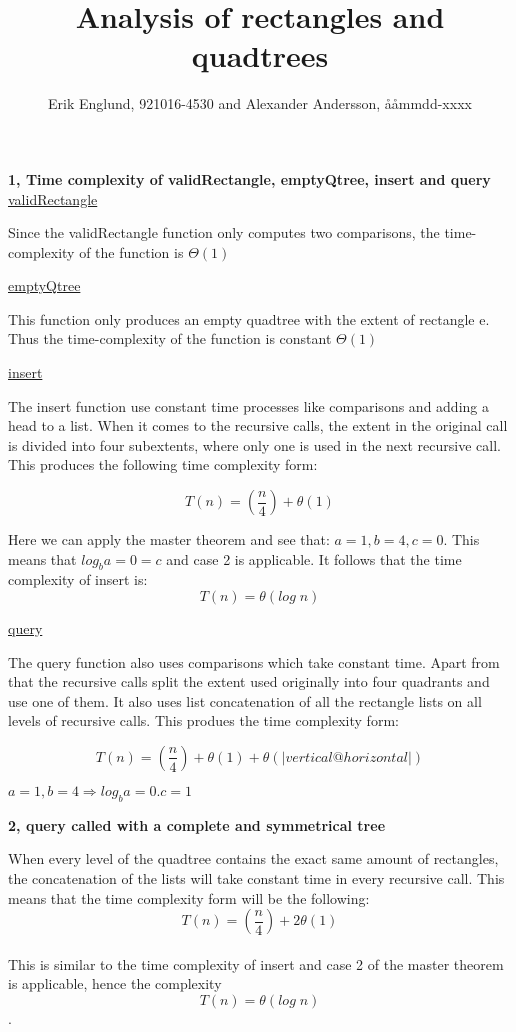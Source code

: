 \documentclass[12pt, a4paper]{article}
\title{Analysis of rectangles and quadtrees}
\author{Erik Englund, 921016-4530 and Alexander Andersson, ååmmdd-xxxx}
\begin{document}
\maketitle

\textbf{1, Time complexity of validRectangle, emptyQtree, insert and query}\\

\underline{validRectangle}

Since the validRectangle function only computes two comparisons, the time-complexity of the function is 
$\Theta(1)$




\underline{emptyQtree}

This function only produces an empty quadtree with the extent of rectangle e. Thus the time-complexity of the function is constant $\Theta(1)$



\underline{insert}

The insert function use constant time processes like comparisons and adding a head to a list. When it comes to the recursive calls, the extent in the original call is divided into four subextents, where only one is used in the next recursive call. This produces the following time complexity form:

$$T(n)=\left(\frac{n}{4}\right)+\theta(1)$$

Here we can apply the master theorem and see that: $a=1, b=4, c=0$. This means that $log_ba=0 = c$ and case 2 is applicable. It follows that the time complexity of insert is: $$T(n)=\theta(log\;n)$$





\underline{query}

The query function also uses comparisons which take constant time. Apart from that the recursive calls split the extent used originally into four quadrants and use one of them. It also uses list concatenation of all the rectangle lists on all levels of recursive calls. This produes the time complexity form:

$$T(n)=\left(\frac{n}{4}\right)+\theta(1)+\theta(|vertical@horizontal|)$$

$a=1, b=4 \Rightarrow log_ba=0. c = 1$

\textbf{2, query called with a complete and symmetrical tree}

When every level of the quadtree contains the exact same amount of rectangles, the concatenation of the lists will take constant time in every recursive call. This means that the time complexity form will be the following: $$T(n)=\left(\frac{n}{4}\right)+2\theta(1)$$\\

This is similar to the time complexity of insert and case 2 of the master theorem is applicable, hence the complexity $$T(n)=\theta(log\;n)$$.
\end{document}
